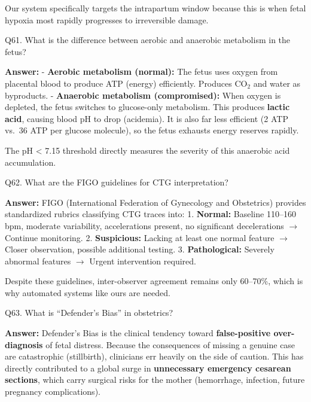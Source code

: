 \documentclass[11pt,a4paper]{article}
\begin{document}
Our system specifically targets the intrapartum window because this is
when fetal hypoxia most rapidly progresses to irreversible damage.

\begin{questionbox}
Q61. What is the difference between aerobic and anaerobic
metabolism in the fetus?
\end{questionbox}
\textbf{Answer:} - \textbf{Aerobic metabolism (normal):} The fetus uses
oxygen from placental blood to produce ATP (energy) efficiently.
Produces CO$_{2}$ and water as byproducts. - \textbf{Anaerobic metabolism
(compromised):} When oxygen is depleted, the fetus switches to
glucose-only metabolism. This produces \textbf{lactic acid}, causing
blood pH to drop (acidemia). It is also far less efficient (2 ATP vs.~36
ATP per glucose molecule), so the fetus exhausts energy reserves
rapidly.

The pH \textless{} 7.15 threshold directly measures the severity of this
anaerobic acid accumulation.

\begin{questionbox}
Q62. What are the FIGO guidelines for CTG interpretation?
\end{questionbox}
\textbf{Answer:} FIGO (International Federation of Gynecology and Obstetrics)
provides standardized rubrics classifying CTG traces into: 1.
\textbf{Normal:} Baseline 110--160 bpm, moderate variability,
accelerations present, no significant decelerations $\rightarrow$ Continue
monitoring. 2. \textbf{Suspicious:} Lacking at least one normal feature
$\rightarrow$ Closer observation, possible additional testing. 3.
\textbf{Pathological:} Severely abnormal features $\rightarrow$ Urgent intervention
required.

Despite these guidelines, inter-observer agreement remains only
60--70\%, which is why automated systems like ours are needed.

\begin{questionbox}
Q63. What is ``Defender's Bias'' in obstetrics?
\end{questionbox}
\textbf{Answer:} Defender's Bias is the clinical tendency toward
\textbf{false-positive over-diagnosis} of fetal distress. Because the
consequences of missing a genuine case are catastrophic (stillbirth),
clinicians err heavily on the side of caution. This has directly
contributed to a global surge in \textbf{unnecessary emergency cesarean
sections}, which carry surgical risks for the mother (hemorrhage,
infection, future pregnancy complications).
\end{document}
